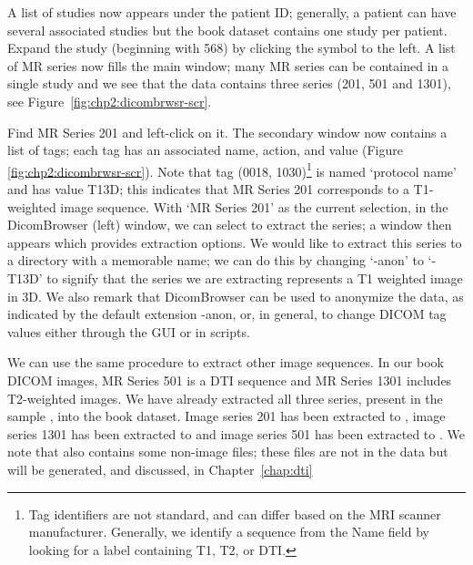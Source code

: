 A list of studies now appears under the patient ID; generally, a
patient can have several associated studies but the book dataset
contains one study per patient. Expand the study (beginning with 568)
by clicking the symbol to the left. A list of MR series now fills the
main window; many MR series can be contained in a single study and we
see that the \emp{\erniedicom} data contains three series (201, 501 and 1301), 
see Figure~\ref{fig:chp2:dicombrwsr-scr}.

Find MR Series 201 and left-click on it. The secondary window now
contains a list of tags; each tag has an associated name, action, and
value (Figure \ref{fig:chp2:dicombrwsr-scr}). Note that tag (0018,
1030)\footnote{Tag identifiers are not standard, and can differ based
  on the MRI scanner manufacturer.  Generally, we identify a
  sequence from the Name field by looking for a label containing T1,
  T2, or DTI.} is named `protocol name' and has value T13D; this
indicates that MR Series 201 corresponds to a T1-weighted image
sequence. With `MR Series 201' as the current selection, in the DicomBrowser 
(left) window, we can select  to extract the 
series; a window then appears which provides extraction options.  We would 
like to extract this series to a directory with a memorable name; we can 
do this by changing `-anon' to `-T13D' to signify that the series we are 
extracting represents a T1 weighted image in 3D.  %
%
We also remark that DicomBrowser can be used to anonymize the data, as
indicated by the default extension {-anon}, or, in general, to change
DICOM tag values either through the GUI or in scripts. 

We can use the same procedure to extract other image sequences. In our
book DICOM images, MR Series 501 is a DTI sequence and MR Series 1301
includes T2-weighted images.  We have already extracted all three series, 
present in the sample , into the book dataset.  Image series 
201 has been extracted to , image series 1301 has been 
extracted to  and image series 501 has been extracted to    
.  We note that  also contains 
some non-image files; these files are not in the  data but 
will be generated, and discussed, in Chapter~\ref{chap:dti}   
%


